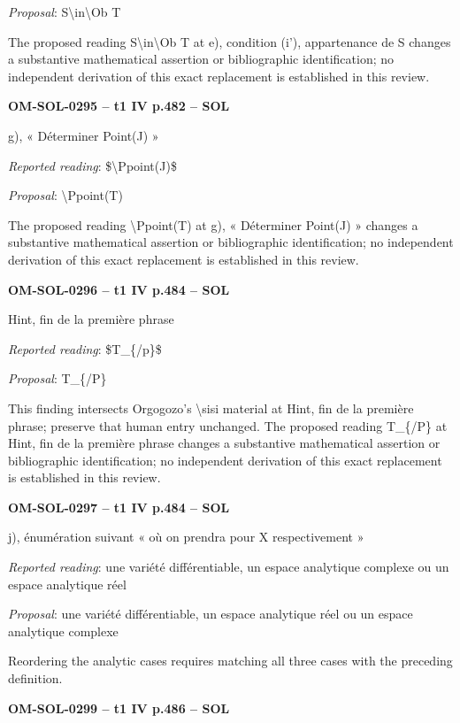 \emph{Proposal}: S\textbackslash{}in\textbackslash{}Ob T\par
The proposed reading S\textbackslash{}in\textbackslash{}Ob T at e), condition (i'), appartenance de S changes a substantive mathematical assertion or bibliographic identification; no independent derivation of this exact replacement is established in this review.\par
\par\noindent\textbf{OM-SOL-0295 -- t1 IV p.482 -- SOL}\par
g), « Déterminer Point(J) »\par
\emph{Reported reading}: \$\textbackslash{}Ppoint(J)\$\par
\emph{Proposal}: \textbackslash{}Ppoint(T)\par
The proposed reading \textbackslash{}Ppoint(T) at g), « Déterminer Point(J) » changes a substantive mathematical assertion or bibliographic identification; no independent derivation of this exact replacement is established in this review.\par
\par\noindent\textbf{OM-SOL-0296 -- t1 IV p.484 -- SOL}\par
Hint, fin de la première phrase\par
\emph{Reported reading}: \$T\_\{/p\}\$\par
\emph{Proposal}: T\_\{/P\}\par
This finding intersects Orgogozo's \textbackslash{}sisi material at Hint, fin de la première phrase; preserve that human entry unchanged. The proposed reading T\_\{/P\} at Hint, fin de la première phrase changes a substantive mathematical assertion or bibliographic identification; no independent derivation of this exact replacement is established in this review.\par
\par\noindent\textbf{OM-SOL-0297 -- t1 IV p.484 -- SOL}\par
j), énumération suivant « où on prendra pour X respectivement »\par
\emph{Reported reading}: une variété différentiable, un espace analytique complexe ou un espace analytique réel\par
\emph{Proposal}: une variété différentiable, un espace analytique réel ou un espace analytique complexe\par
Reordering the analytic cases requires matching all three cases with the preceding definition.\par
\par\noindent\textbf{OM-SOL-0299 -- t1 IV p.486 -- SOL}\par
